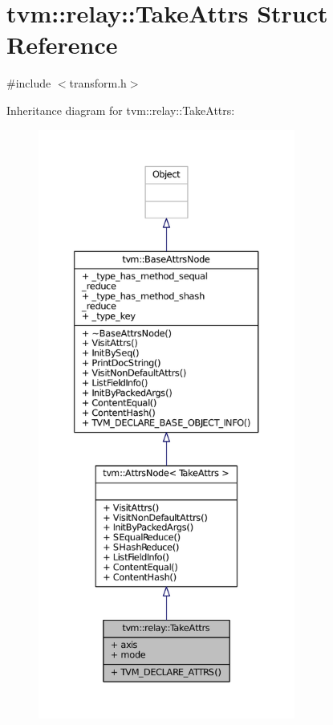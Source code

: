 \hypertarget{structtvm_1_1relay_1_1TakeAttrs}{}\section{tvm\+:\+:relay\+:\+:Take\+Attrs Struct Reference}
\label{structtvm_1_1relay_1_1TakeAttrs}


{\ttfamily \#include $<$transform.\+h$>$}



Inheritance diagram for tvm\+:\+:relay\+:\+:Take\+Attrs\+:
\nopagebreak
\begin{figure}[H]
\begin{center}
\leavevmode
\includegraphics[height=550pt]{structtvm_1_1relay_1_1TakeAttrs__inherit__graph}
\end{center}
\end{figure}


